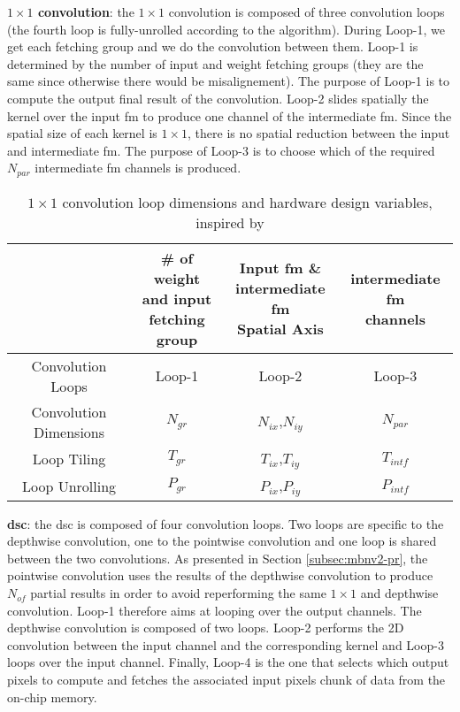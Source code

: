 \textbf{$1 \times 1$ convolution}: the $1 \times 1$ convolution is composed of three convolution loops (the fourth loop is fully-unrolled according to the algorithm). During Loop-1, we get each fetching group and we do the convolution between them. Loop-1 is determined by the number of input and weight fetching groups (they are the same since otherwise there would be misalignement). The purpose of Loop-1 is to compute the output final result of the convolution. Loop-2 slides spatially the kernel over the input \acrshort{fm} to produce one channel of the intermediate \acrshort{fm}. Since the spatial size of each kernel is $1 \times 1$, there is no spatial reduction between the input and intermediate \acrshort{fm}. The purpose of Loop-3 is to choose which of the required $N_{par}$ intermediate \acrshort{fm} channels is produced.
%
\begin{table}[H]
    \centering
    \begin{tabular}{c|c|c|c}
    \hline \hline
    & \makecell{\# of weight \\ and input \\ fetching group} & \makecell{Input \acrshort{fm} \& \\ intermediate \acrshort{fm} \\ Spatial Axis} & \makecell{intermediate \acrshort{fm} \\ channels} \\
    \hline
    Convolution Loops & Loop-1 & Loop-2 & Loop-3 \\
    Convolution Dimensions & $N_{gr}$ & $N_{ix}$,$N_{iy}$ & $N_{par}$ \\
    Loop Tiling            & $T_{gr}$ & $T_{ix}$,$T_{iy}$ & $T_{intf}$ \\
    Loop Unrolling         & $P_{gr}$ & $P_{ix}$,$P_{iy}$ & $P_{intf}$ \\
    \hline \hline
    \end{tabular}
    \caption{$1 \times 1$ convolution loop dimensions and hardware design variables, inspired by \cite{ma_optimizing_2018}}
    \label{tab:param_c11}
\end{table}
%
\textbf{\acrshort{dsc}}: the \acrshort{dsc} is composed of four convolution loops. Two loops are specific to the depthwise convolution, one to the pointwise convolution and one loop is shared between the two convolutions. As presented in Section \ref{subsec:mbnv2-pr}, the pointwise convolution uses the results of the depthwise convolution to produce $N_{of}$ partial results in order to avoid reperforming the same $1 \times 1$ and depthwise convolution. Loop-1 therefore aims at looping over the output channels. The depthwise convolution is composed of two loops. Loop-2 performs the 2D convolution between the input channel and the corresponding kernel and Loop-3 loops over the input channel. Finally, Loop-4 is the one that selects which output pixels to compute and fetches the associated input pixels chunk of data from the on-chip memory.
